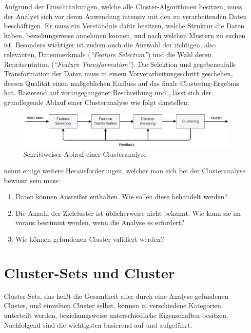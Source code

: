 Aufgrund der Einschränkungen, welche alle Cluster-Algorithmen besitzen, muss der Analyst sich vor deren Anwendung intensiv
mit den zu verarbeitenden Daten beschäftigen. Er muss ein Verständnis dafür besitzen, welche Struktur die Daten
haben, beziehungsweise annehmen können, und nach welchen Mustern zu suchen ist.
Besonders wichtiger ist zudem auch die Auswahl der richtigen, also relevanten, Datenmerkmale (\textit{``Feature Selection''})
und die Wahl deren Repräsentation (\textit{``Feature Transformation''}).
Die Selektion und gegebenenfalls Transformation der Daten muss in einem
Vorverarbeitungsschritt geschehen, dessen Qualität einen maßgeblichen Einfluss auf das finale Clustering-Ergebnis hat.
Basierend auf vorangegangener Beschreibung und \cite[]{Jain1999}, lässt sich der grundlegende Ablauf einer Clusteranalyse wie folgt darstellen: \\

\begin{figure}[H]
    \centering
    \includegraphics[width=\linewidth]{resources/img/grundlagen/clustering_flow}
    \caption[Ablauf einer Clusteranalyse]{Schrittweiser Ablauf einer Clusteranalyse}
    \label{fig:grund_clustering_workflow}
\end{figure}

\cite[]{Jain2010} nennt einige weitere Herausforderungen, welcher man sich bei der Clusteranalyse bewusst sein muss:

\begin{enumerate}
    \item Daten können Ausreißer enthalten. Wie sollen diese behandelt werden?
    \item Die Anzahl der Zielcluster ist üblicherweise nicht bekannt. Wie kann sie im voraus bestimmt werden, wenn die Analyse es erfordert?
    \item Wie können gefundenen Cluster validiert werden?
\end{enumerate}

\section{Cluster-Sets und Cluster}

Cluster-Sets, das heißt die Gesamtheit aller durch eine Analyse gefundenen Cluster, und einzelnen Cluster selbst,
können in verschiedene Kategorien unterteilt werden, beziehungsweise unterschiedliche Eigenschaften besitzen.
Nachfolgend sind die wichtigsten basierend auf \cite[]{tan2007introduction} und \cite[]{Jain1999,Jain2010} aufgeführt.

